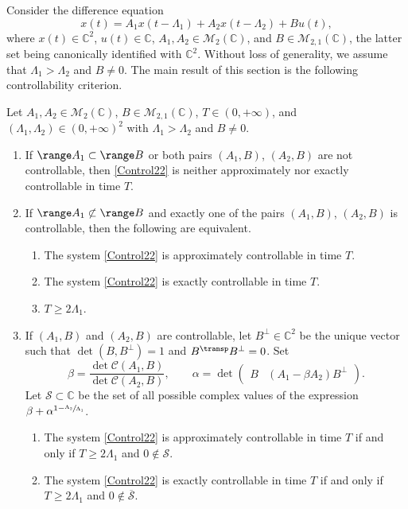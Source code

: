 Consider the difference equation
\begin{equation}
\label{Control22}
x(t) = A_1 x(t - \Lambda_1) + A_2 x(t - \Lambda_2) + B u(t),
\end{equation}
where $x(t) \in \mathbb C^2$, $u(t) \in \mathbb C$, $A_1, A_2 \in \mathcal M_2(\mathbb C)$, and $B \in \mathcal M_{2, 1}(\mathbb C)$, the latter set being canonically identified with $\mathbb C^2$. Without loss of generality, we assume that $\Lambda_1 > \Lambda_2$ and $B \neq 0$. The main result of this section is the following controllability criterion.

\begin{theo}
\label{MainTheo22}
Let $A_1, A_2 \in \mathcal M_2(\mathbb C)$, $B \in \mathcal M_{2, 1}(\mathbb C)$, $T \in (0, +\infty)$, and $(\Lambda_1, \Lambda_2) \in (0, +\infty)^2$ with $\Lambda_1 > \Lambda_2$ and $B \neq 0$.
\begin{enumerate}
\item\label{MainTheoA1BNonContr} If $\range A_1 \subset \range B$ or both pairs $(A_1, B)$, $(A_2, B)$ are not controllable, then \eqref{Control22} is neither approximately nor exactly controllable in time $T$.
\item\label{MainTheoA2BNonContr} If $\range A_1 \not\subset \range B$ and exactly one of the pairs $(A_1, B)$, $(A_2, B)$ is controllable, then the following are equivalent.
\begin{enumerate}
\item The system \eqref{Control22} is approximately controllable in time $T$.
\item The system \eqref{Control22} is exactly controllable in time $T$.
\item $T \geq 2 \Lambda_{1}$.
\end{enumerate}
\item\label{MainTheoA1A2Contr} If $(A_1, B)$ and $(A_2, B)$ are controllable, let $B^\perp \in \mathbb C^2$ be the unique vector such that $\det(B, B^\perp)  = 1$ and $B^\transp B^\perp = 0$. Set
\begin{equation}
\label{DefAlphaBeta}
\beta = \frac{\det \mathcal C(A_1, B)}{\det \mathcal C(A_2, B)}, \qquad \alpha = \det \begin{pmatrix}B & (A_1 - \beta A_2) B^\perp\end{pmatrix}.
\end{equation}
Let $\mathcal S \subset \mathbb C$ be the set of all possible complex values of the expression $\beta + \alpha^{1 - \sfrac{\Lambda_{2}}{\Lambda_{1}}}$.
\begin{enumerate}
\item\label{MainTheoApprox} The system \eqref{Control22} is approximately controllable in time $T$ if and only if $T \geq 2 \Lambda_{1}$ and $0 \notin \mathcal S$.
\item\label{MainTheoExact} The system \eqref{Control22} is exactly controllable in time $T$ if and only if $T \geq 2 \Lambda_{1}$ and $0 \notin \overline{\mathcal S}$.
\end{enumerate}
\end{enumerate}
\end{theo}

